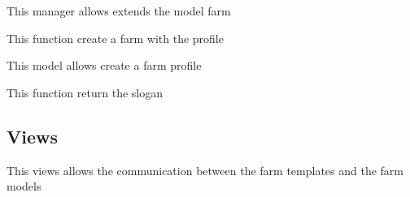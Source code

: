 \documentclass[letterpaper,10pt,english]{sphinxmanual}
\begin{document}

\begin{fulllineitems}
\label{modules/farm:apps.farm.models.FarmManager}
This manager allows extends the model farm

\begin{fulllineitems}
\label{modules/farm:apps.farm.models.FarmManager.create_farm}
This function create a farm with the profile

\end{fulllineitems}


\end{fulllineitems}


\begin{fulllineitems}
\label{modules/farm:apps.farm.models.FarmProfile}
This model allows create a farm profile

\begin{fulllineitems}
\label{modules/farm:apps.farm.models.FarmProfile.get_slogan}
This function return the slogan

\end{fulllineitems}


\end{fulllineitems}



\subsection{Views}
\label{modules/farm:views}
This views allows the communication between the farm templates and the farm models
\label{modules/farm:module-apps.farm.views}
\end{document}
